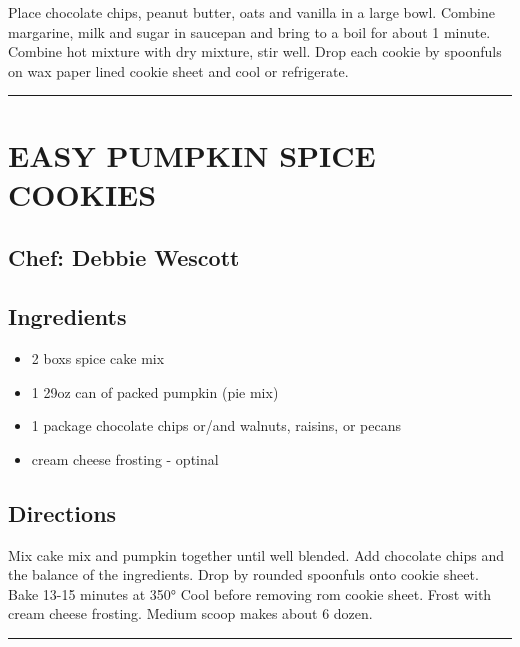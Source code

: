 \documentclass[
]{book}
\providecommand{\tightlist}{%
  \setlength{\itemsep}{0pt}\setlength{\parskip}{0pt}}
\begin{document}
Place chocolate chips, peanut butter, oats and vanilla in a large bowl. Combine margarine, milk and sugar in saucepan and bring to a boil for about 1 minute. Combine hot mixture with dry mixture, stir well. Drop each cookie by spoonfuls on wax paper lined cookie sheet and cool or refrigerate.

\begin{center}\rule{0.5\linewidth}{0.5pt}\end{center}

\hypertarget{easy-pumpkin-spice-cookies}{%
\section*{EASY PUMPKIN SPICE COOKIES}\label{easy-pumpkin-spice-cookies}}


\hypertarget{chef-debbie-wescott-6}{%
\subsection*{Chef: Debbie Wescott}\label{chef-debbie-wescott-6}}


\hypertarget{ingredients-93}{%
\subsection*{Ingredients}\label{ingredients-93}}


\begin{itemize}
\tightlist
\item
  2 boxs spice cake mix
\item
  1 29oz can of packed pumpkin (pie mix)
\item
  1 package chocolate chips or/and walnuts, raisins, or pecans
\item
  cream cheese frosting - optinal
\end{itemize}

\hypertarget{directions-93}{%
\subsection*{Directions}\label{directions-93}}


Mix cake mix and pumpkin together until well blended. Add chocolate chips and the balance of the ingredients. Drop by rounded spoonfuls onto cookie sheet. Bake 13-15 minutes at 350° Cool before removing rom cookie sheet. Frost with cream cheese frosting. Medium scoop makes about 6 dozen.

\begin{center}\rule{0.5\linewidth}{0.5pt}\end{center}
\end{document}
